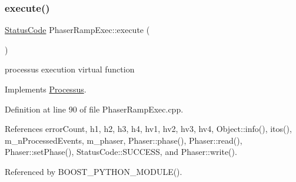\subsubsection{\texorpdfstring{execute()}{execute()}}
{\footnotesize\ttfamily \hyperlink{classStatusCode}{Status\+Code} Phaser\+Ramp\+Exec\+::execute (\begin{DoxyParamCaption}{ }\end{DoxyParamCaption})\hspace{0.3cm}{\ttfamily [virtual]}}

processus execution virtual function 

Implements \hyperlink{classProcessus_a63767a63a1fb0055c5aa45b21a4a5d58}{Processus}.



Definition at line 90 of file Phaser\+Ramp\+Exec.\+cpp.



References error\+Count, h1, h2, h3, h4, hv1, hv2, hv3, hv4, Object\+::info(), itos(), m\+\_\+n\+Processed\+Events, m\+\_\+phaser, Phaser\+::phase(), Phaser\+::read(), Phaser\+::set\+Phase(), Status\+Code\+::\+S\+U\+C\+C\+E\+SS, and Phaser\+::write().



Referenced by B\+O\+O\+S\+T\+\_\+\+P\+Y\+T\+H\+O\+N\+\_\+\+M\+O\+D\+U\+L\+E().


